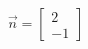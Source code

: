 \documentclass[preview]{standalone}
\begin{document}
\begin{align*}
\vec n=\begin{bmatrix}2\\-1\end{bmatrix}
\end{align*}
\end{document}
